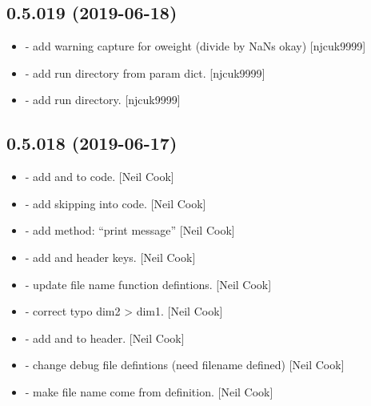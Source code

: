 \documentclass[a4paper,10pt,english]{report}
\begin{document}
\subsection{0.5.019 (2019-06-18)}
\label{\detokenize{misc/changelog:id117}}\begin{itemize}
\item {} 
 - add warning capture for oweight (divide by NaNs okay)
{[}njcuk9999{]}

\item {} 
 - add run directory from param dict. {[}njcuk9999{]}

\item {} 
 - add run directory. {[}njcuk9999{]}

\end{itemize}


\subsection{0.5.018 (2019-06-17)}
\label{\detokenize{misc/changelog:id118}}\begin{itemize}
\item {} 
 - add  and  to code. {[}Neil Cook{]}

\item {} 
 - add skipping into code. {[}Neil Cook{]}

\item {} 
 - add method: “print message” {[}Neil Cook{]}

\item {} 
 - add  and  header keys. {[}Neil Cook{]}

\item {} 
 - update file name function defintions. {[}Neil Cook{]}

\item {} 
 - correct typo dim2 \textendash{}\textgreater{} dim1. {[}Neil Cook{]}

\item {} 
 - add  and  to header. {[}Neil Cook{]}

\item {} 
 - change debug file defintions (need filename
defined) {[}Neil Cook{]}

\item {} 
 - make file name come from definition. {[}Neil
Cook{]}

\end{itemize}
\end{document}
